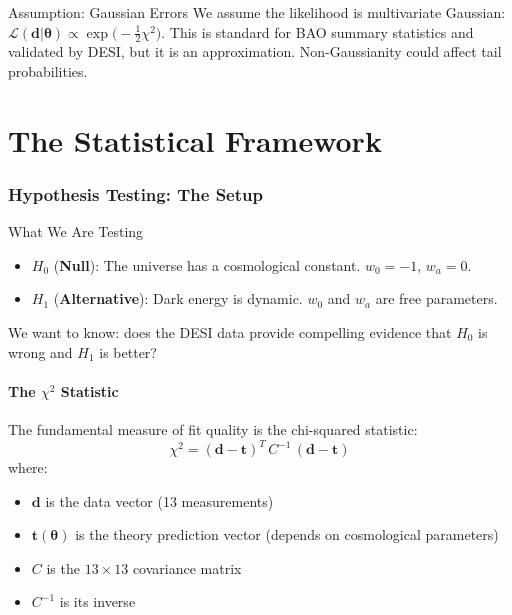 \documentclass[11pt,a4paper]{article}
\begin{document}
\begin{warningbox}{Assumption: Gaussian Errors}
We assume the likelihood is multivariate Gaussian: $\mathcal{L}(\mathbf{d}|\boldsymbol{\theta}) \propto \exp\!\big(-\tfrac{1}{2}\chi^2\big)$. This is standard for BAO summary statistics and validated by DESI, but it is an approximation. Non-Gaussianity could affect tail probabilities.
\end{warningbox}


\part{The Statistical Framework}

\section{Hypothesis Testing: The Setup}
\label{sec:hypotheses}

\begin{conceptbox}{What We Are Testing}
\begin{itemize}
    \item $H_0$ (\textbf{Null}): The universe has a cosmological constant. $w_0 = -1$, $w_a = 0$.
    \item $H_1$ (\textbf{Alternative}): Dark energy is dynamic. $w_0$ and $w_a$ are free parameters.
\end{itemize}
We want to know: does the DESI data provide compelling evidence that $H_0$ is wrong and $H_1$ is better?
\end{conceptbox}

\subsection{The $\chi^2$ Statistic}

The fundamental measure of fit quality is the chi-squared statistic:
\begin{equation}
\boxed{\chi^2 = (\mathbf{d} - \mathbf{t})^T \, C^{-1} \, (\mathbf{d} - \mathbf{t})}
\label{eq:chi2}
\end{equation}
where:
\begin{itemize}
    \item $\mathbf{d}$ is the data vector (13 measurements)
    \item $\mathbf{t}(\boldsymbol{\theta})$ is the theory prediction vector (depends on cosmological parameters)
    \item $C$ is the $13 \times 13$ covariance matrix
    \item $C^{-1}$ is its inverse
\end{itemize}
\end{document}
